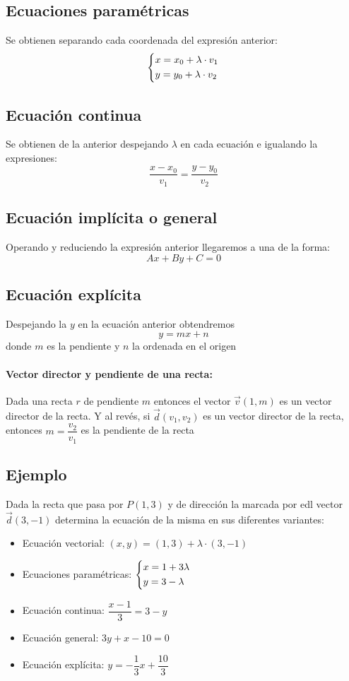 \documentclass[a4paper,spanish,9pt]{extarticle}
\begin{document}
\begin{multicols*}{2}
\subsection{Ecuaciones paramétricas}
Se obtienen separando cada coordenada del expresión anterior:
$$\left\lbrace \begin{gathered}
  x = x_0 + \lambda\cdot v_1 \hfill \\
  y = y_0 + \lambda\cdot v_2 \hfill \\ 
\end{gathered}  \right.
$$
 
\subsection{Ecuación continua}
Se obtienen de la anterior despejando $\lambda$ en cada ecuación e igualando la expresiones:
$$ \dfrac{x-x_0}{v_1}=\dfrac{y-y_0}{v_2}$$

\subsection{Ecuación implícita o general}
Operando y reduciendo la expresión anterior llegaremos a una de la forma:
$$Ax+By+C=0$$

\subsection{Ecuación explícita}
Despejando la $y$ en la ecuación anterior obtendremos
$$y=mx+n$$
donde $m$ es la pendiente y $n$ la ordenada en el origen
\paragraph*{Vector director y pendiente de una recta:} 
Dada una recta $r$ de pendiente $m$ entonces el vector $\overrightarrow{v}(1,m)$ es un vector director de la recta. Y al revés, si $\overrightarrow{d}(v_1,v_2)$ es un vector director de la recta, entonces $m=\dfrac{v_2}{v_1}$ es la pendiente de la recta 

\subsection{Ejemplo}
Dada la recta que pasa por $P(1,3)$ y de dirección la marcada por edl vector $\overrightarrow{d}(3,-1)$ determina la ecuación de la misma en sus diferentes variantes:
\begin{itemize}
\item Ecuación vectorial:
$(x,y)=(1,3)+\lambda\cdot(3,-1)$
\item Ecuaciones paramétricas:
$\left\lbrace \begin{gathered}
  x = 1 + 3\lambda \hfill \\
  y = 3 - \lambda \hfill \\ 
\end{gathered}  \right.
$
\item Ecuación continua:
$\dfrac{x-1}{3}=3-y$
\item Ecuación general:
$3y+x-10=0$
\item Ecuación explícita:
$y=-\dfrac{1}{3}x+\dfrac{10}{3}$
\end{itemize}


\end{multicols*}
\end{document}
